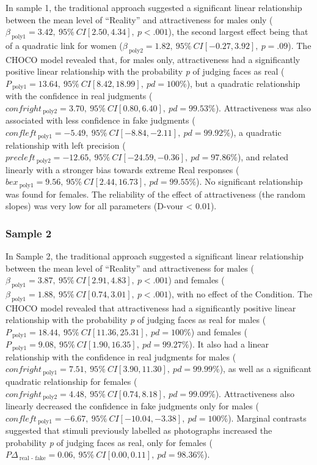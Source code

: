 \documentclass[
  jou,
  floatsintext,
  longtable,
  nolmodern,
  notxfonts,
  notimes,
  colorlinks=true,linkcolor=blue,citecolor=blue,urlcolor=blue]{apa7}
\begin{document}
In sample 1, the traditional approach suggested a significant linear
relationship between the mean level of ``Reality'' and attractiveness
for males only
(\(\beta_{~\text{poly1}}=3.42, ~95\%~CI [2.50, 4.34], ~p < .001\)), the
second largest effect being that of a quadratic link for women
(\(\beta_{~\text{poly2}}=1.82, ~95\%~CI [-0.27, 3.92], ~p = .09\)). The
CHOCO model revealed that, for males only, attractiveness had a
significantly positive linear relationship with the probability \emph{p}
of judging faces as real
(\(P_{~\text{poly1}}=13.64, ~95\%~CI [8.42, 18.99], ~pd = 100\%\)), but
a quadratic relationship with the confidence in real judgments
(\(confright_{~\text{poly2}}=3.70, ~95\%~CI [0.80, 6.40], ~pd = 99.53\%\)).
Attractiveness was also associated with less confidence in fake
judgments
(\(confleft_{~\text{poly1}}=-5.49, ~95\%~CI [-8.84, -2.11], ~pd =  99.92\%\)),
a quadratic relationship with left precision
(\(precleft_{~\text{poly2}}=-12.65    , ~95\%~CI [-24.59, -0.36], ~pd = 97.86\%\)),
and related linearly with a stronger bias towards extreme Real responses
(\(bex_{~\text{poly1}}=9.56    , ~95\%~CI [2.44, 16.73], ~pd = 99.55\%\)).
No significant relationship was found for females. The reliability of
the effect of attractiveness (the random slopes) was very low for all
parameters (D-vour \textless{} 0.01).

\subsubsection{Sample 2}\label{sample-2}

In Sample 2, the traditional approach suggested a significant linear
relationship between the mean level of ``Reality'' and attractiveness
for males
(\(\beta_{~\text{poly1}}=3.87, ~95\%~CI [2.91, 4.83], ~p < .001\)) and
females
(\(\beta_{~\text{poly1}}=1.88, ~95\%~CI [0.74, 3.01], ~p < .001\)), with
no effect of the Condition. The CHOCO model revealed that attractiveness
had a significantly positive linear relationship with the probability
\emph{p} of judging faces as real for males
(\(P_{~\text{poly1}}=18.44, ~95\%~CI [11.36, 25.31], ~pd = 100\%\)) and
females
(\(P_{~\text{poly1}}=9.08, ~95\%~CI [1.90, 16.35], ~pd = 99.27\%\)). It
also had a linear relationship with the confidence in real judgments for
males
(\(confright_{~\text{poly1}}=7.51, ~95\%~CI [3.90, 11.30], ~pd = 99.99\%\)),
as well as a significant quadratic relationship for females
(\(confright_{~\text{poly2}}=4.48, ~95\%~CI [0.74, 8.18], ~pd = 99.09\%\)).
Attractiveness also linearly decreased the confidence in fake judgments
only for males
(\(confleft_{~\text{poly1}}=-6.67, ~95\%~CI [-10.04, -3.38], ~pd = 100\%\)).
Marginal contrasts suggested that stimuli previously labelled as
photographs increased the probability \emph{p} of judging faces as real,
only for females
(\(P \Delta_{~\text{real - fake}}=0.06, ~95\%~CI [0.00, 0.11], ~pd = 98.36\%\)).
\end{document}
